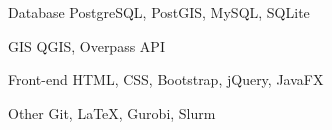 
\begin{cvskills}

\cvskill
  {Database} 
  {PostgreSQL, PostGIS, MySQL, SQLite}

\cvskill
  {GIS} 
  {QGIS, Overpass API}

\cvskill
  {Front-end} 
  {HTML, CSS, Bootstrap, jQuery, JavaFX}

\cvskill
  {Other}
  {Git, \LaTeX, Gurobi, Slurm}   

\end{cvskills}